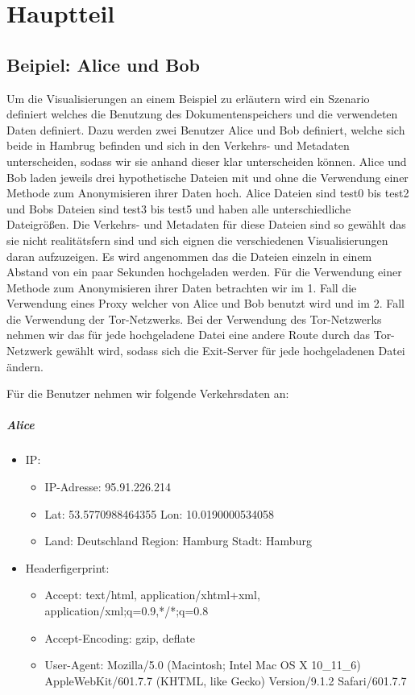 \documentclass[
    fontsize=12pt,
    headings=small,
    parskip=half,           %
    bibliography=totoc,
    numbers=noenddot,       %
    open=any,               %
    ]{scrreprt}
\begin{document}

\chapter{Hauptteil}

    \section{Beipiel: Alice und Bob}
Um die Visualisierungen an einem Beispiel zu erläutern wird ein Szenario definiert welches die Benutzung des Dokumentenspeichers und die verwendeten Daten definiert.
Dazu werden zwei Benutzer Alice und Bob definiert, welche sich beide in Hambrug befinden und sich in den Verkehrs- und Metadaten unterscheiden, sodass wir sie anhand dieser klar unterscheiden können.
Alice und Bob laden jeweils drei hypothetische Dateien mit und ohne die Verwendung einer Methode zum Anonymisieren ihrer Daten hoch.
Alice Dateien sind test0 bis test2 und Bobs Dateien sind test3 bis test5 und haben alle unterschiedliche Dateigrößen.
Die Verkehrs- und Metadaten für diese Dateien sind so gewählt das sie nicht realitätsfern sind und sich eignen die verschiedenen Visualisierungen daran aufzuzeigen. 
Es wird angenommen das die Dateien einzeln in einem Abstand von ein paar Sekunden hochgeladen werden.
Für die Verwendung einer Methode zum Anonymisieren ihrer Daten betrachten wir im 1. Fall die Verwendung eines Proxy welcher von Alice und Bob benutzt wird und im 2. Fall die Verwendung der Tor-Netzwerks. Bei der Verwendung des Tor-Netzwerks nehmen wir das für jede hochgeladene Datei eine andere Route durch das Tor-Netzwerk gewählt wird, sodass sich die Exit-Server für jede hochgeladenen Datei ändern.

Für die Benutzer nehmen wir folgende Verkehrsdaten an: 
\paragraph{Alice}
\begin{itemize}
  \item IP: 
  \begin{itemize}
  \item IP-Adresse: 95.91.226.214
  \item Lat: 53.5770988464355 Lon: 10.0190000534058
  \item Land: Deutschland Region: Hamburg Stadt: Hamburg
  \end{itemize}
  \item Headerfigerprint:  
  \begin{itemize}
  \item Accept: text/html, application/xhtml+xml, application/xml;q=0.9,*/*;q=0.8
  \item Accept-Encoding: gzip, deflate
  \item User-Agent: Mozilla/5.0 (Macintosh; Intel Mac OS X 10\_11\_6) AppleWebKit/601.7.7 (KHTML, like Gecko) Version/9.1.2 Safari/601.7.7
  \end{itemize}
\end{itemize}
\end{document}
